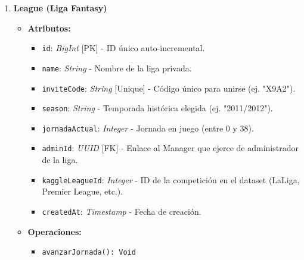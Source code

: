 \begin{enumerate}
    \item \textbf{League (Liga Fantasy)}
    \begin{itemize}
        \item \textbf{Atributos:}
            \begin{itemize}
                \item \texttt{id}: \textit{BigInt} [PK] - ID único auto-incremental.
                \item \texttt{name}: \textit{String} - Nombre de la liga privada.
                \item \texttt{inviteCode}: \textit{String} [Unique] - Código único para unirse (ej. "X9A2").
                \item \texttt{season}: \textit{String} - Temporada histórica elegida (ej. "2011/2012").
                \item \texttt{jornadaActual}: \textit{Integer} - Jornada en juego (entre 0 y 38).
                \item \texttt{adminId}: \textit{UUID} [FK] - Enlace al Manager que ejerce de administrador de la liga.
                \item \texttt{kaggleLeagueId}: \textit{Integer} - ID de la competición en el dataset (LaLiga, Premier League, etc.).
                \item \texttt{createdAt}: \textit{Timestamp} - Fecha de creación.
            \end{itemize}
        \item \textbf{Operaciones:}
            \begin{itemize}
                \item \texttt{avanzarJornada(): Void}
            \end{itemize}
    \end{itemize}


\end{enumerate}
